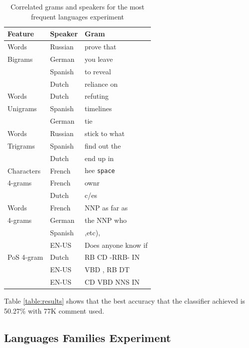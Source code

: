 \documentclass[11pt]{article}
\begin{document}
\begin{table}[htp]
\begin{tabular}{l|ll}
	\textbf{Feature} & \textbf{Speaker}  & \textbf{Gram}
	\\\hline
	Words & Russian &prove that\\
	 Bigrams& German& you leave\\
	 & Spanish& to reveal\\
	 & Dutch & reliance on\\\hline
	 
	Words &Dutch& refuting\\
	   Unigrams&Spanish&timelines\\
	    &German& tie\\\hline
	    
	Words 	&Russian& stick to what\\
	Trigrams&Spanish& find out the\\
	&Dutch& end up in\\\hline

	Characters &French& hee \verb+space+\\
	4-grams	&French&ownr\\
		&Dutch&c/es\\
	\hline

	Words &French& NNP as far as\\
	4-grams &German& the NNP who\\
	&Spanish& ,etc),\\
	&EN-US& Does anyone know if\\\hline
	
	PoS 4-gram &Dutch& RB CD -RRB- IN \\
	&EN-US& VBD , RB DT\\
	&EN-US& CD VBD NNS IN\\
	
\end{tabular}
\label{table:nonnative}
\caption{Correlated grams and speakers for the most frequent languages experiment}
\end{table}


Table \ref{table:results} shows that the best accuracy that the classifier achieved is 50.27\% with 77K comment used. 
\subsection{Languages Families Experiment}
\end{document}
